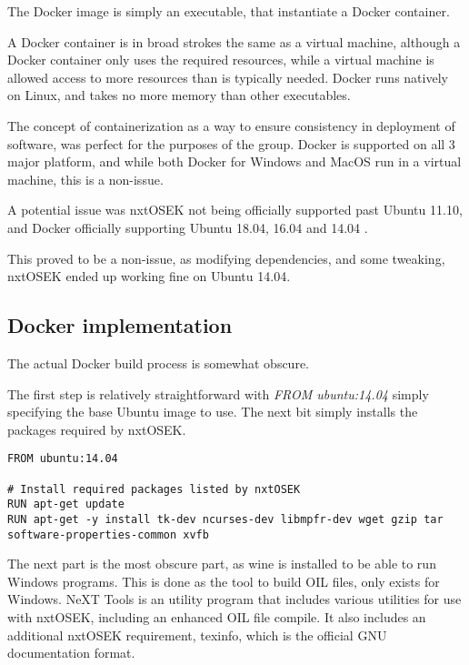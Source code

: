 The Docker image is simply an executable, that instantiate a Docker container.

A Docker container is in broad strokes the same as a virtual machine, although a Docker container only uses the required resources, while a virtual machine is allowed access to more resources than is typically needed.
Docker runs natively on Linux, and takes no more memory than other executables.

The concept of containerization as a way to ensure consistency in deployment of software, was perfect for the purposes of the group.
Docker is supported on all 3 major platform, and while both Docker for Windows and MacOS run in a virtual machine, this is a non-issue.

A potential issue was nxtOSEK not being officially supported past Ubuntu 11.10, and Docker officially supporting Ubuntu 18.04, 16.04 and 14.04 \cite{dockerubuntu}.

This proved to be a non-issue, as modifying dependencies, and some tweaking, nxtOSEK ended up working fine on Ubuntu 14.04.

\subsection{Docker implementation}\label{subsec:dockerimplementation}
The actual Docker build process is somewhat obscure.

The first step is relatively straightforward with \textit{FROM ubuntu:14.04} simply specifying the base Ubuntu image to use.
The next bit simply installs the packages required by nxtOSEK.
\begin{lstlisting}[language=docker,label={lst:dockerimplementation1},caption={Version definition and installation of packages required by nxtOSEK}]
FROM ubuntu:14.04

# Install required packages listed by nxtOSEK
RUN apt-get update
RUN apt-get -y install tk-dev ncurses-dev libmpfr-dev wget gzip tar software-properties-common xvfb
\end{lstlisting}

The next part is the most obscure part, as wine is installed to be able to run Windows programs.
This is done as the tool to build OIL files, only exists for Windows.
NeXT Tools is an utility program that includes various utilities for use with nxtOSEK, including an enhanced OIL file compile\cite{nxttool}.
It also includes an additional nxtOSEK requirement, texinfo, which is the official GNU documentation format\cite{texinfo}.

